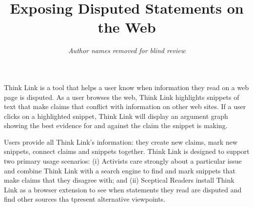 \documentclass{chi2009}
\begin{document}

\toappear{}



\title{Exposing Disputed Statements on the Web}


\author{
\parbox[t]{9cm}{\centering
	     {\em Author names removed for blind review}\\
}
}

\maketitle


\abstract
Think Link is a tool that helps a user know when information they read on a web page is disputed. As a user browses the web, Think Link highlights snippets of text that make claims that conflict with information on other web sites. If a user clicks on a highlighted snippet, Think Link will display an argument graph showing the best evidence for and against the claim the snippet is making.

Users provide all Think Link's information: they create new claims, mark new snippets, connect claims and snippets together.
Think Link is designed to support two primary usage scenarios: (i) Activists care strongly about a particular issue and combine Think Link with a search engine to find and mark snippets that make claims that they disagree with; and (ii) Sceptical Readers install Think Link as a browser extension to see when statements they read are disputed and find other sources tha tpresent alternative viewpoints.

\end{document}
